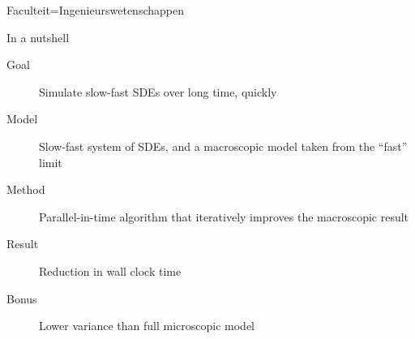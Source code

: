 \documentclass[landscape,a1paper,fontscale=0.45]{kuleuvenposter}
\begin{document}
\begin{poster}{Faculteit=Ingenieurswetenschappen}
%
\begin{posterbox}%
[name=micro-macro modelling, column=0, row=0, boxColorOne=KULeuvenFaculteit!15!white, borderColor=KULeuvenFaculteit]%
{In a nutshell}%
\begin{description}
\item[Goal] Simulate slow-fast SDEs over long time, quickly
\item[Model] Slow-fast system of SDEs, and a macroscopic model taken from the ``fast'' limit
\item[Method] Parallel-in-time algorithm that iteratively improves the macroscopic result
\item[Result] Reduction in wall clock time
\item[Bonus] Lower variance than full microscopic model
\end{description}
\end{posterbox}


\end{poster}
\end{document}
